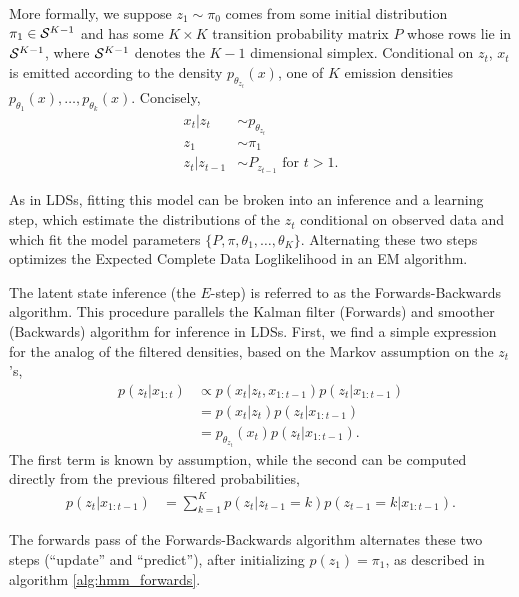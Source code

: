 \documentclass[14pt]{extreport}
\begin{document}
More formally, we suppose $z_{1} \sim \pi_{0}$ comes from some initial
distribution $\pi_{1} \in \mathcal{S}^{K - 1}$ and has some $K \times K$ transition
probability matrix $P$ whose rows lie in $\mathcal{S}^{K - 1}$, where $\mathcal{S}^{K
  - 1}$ denotes the $K - 1$ dimensional simplex. Conditional on $z_{t}$, $x_{t}$
is emitted according to the density $p_{\theta_{z_{t}}}\left(x\right)$, one of
$K$ emission densities $p_{\theta_{1}}\left(x\right), \dots,
p_{\theta_{k}}\left(x\right)$. Concisely,
\begin{align*}
  x_{t} \vert z_{t} &\sim p_{\theta_{z_{t}}} \\
  z_{1} &\sim \pi_{1} \\
  z_{t} \vert z_{t - 1} &\sim P_{z_{t - 1}} \text{ for } t > 1.
\end{align*}

As in LDSs, fitting this model can be broken into an inference and a learning
step, which estimate the distributions of the $z_{t}$ conditional on observed
data and which fit the model parameters $\{P, \pi, \theta_{1}, \dots,
\theta_{K}\}$. Alternating these two steps optimizes the Expected Complete Data
Loglikelihood in an EM algorithm.

The latent state inference (the $E$-step) is referred to as the
Forwards-Backwards algorithm. This procedure parallels the Kalman filter
(Forwards) and smoother (Backwards) algorithm for inference in LDSs. First,
we find a simple expression for the analog of the filtered densities, based on
the Markov assumption on the $z_{t}$'s,
\begin{align*}
  p\left(z_{t} \vert x_{1:t}\right) &\propto p\left(x_{t} \vert z_{t}, x_{1:t - 1}\right) p\left(z_{t} \vert x_{1:t - 1}\right) \\
  &= p\left(x_{t} \vert z_{t}\right) p\left(z_{t} \vert x_{1:t - 1}\right) \\
  &= p_{\theta_{z_{t}}}\left(x_{t}\right)p\left(z_{t} \vert x_{1:t - 1}\right).
\end{align*}
The first term is known by assumption, while the second can be computed directly
from the previous filtered probabilities,
\begin{align*}
  p\left(z_{t} \vert x_{1:t - 1}\right) &= \sum_{k = 1}^{K} p\left(z_{t} \vert z_{t - 1} = k\right)p\left(z_{t - 1} = k \vert x_{1:t - 1} \right).
\end{align*}

The forwards pass of the Forwards-Backwards algorithm alternates these two steps
(``update'' and ``predict''), after initializing $p\left(z_{1}\right) =
\pi_{1}$, as described in algorithm \ref{alg:hmm_forwards}.
\end{document}
